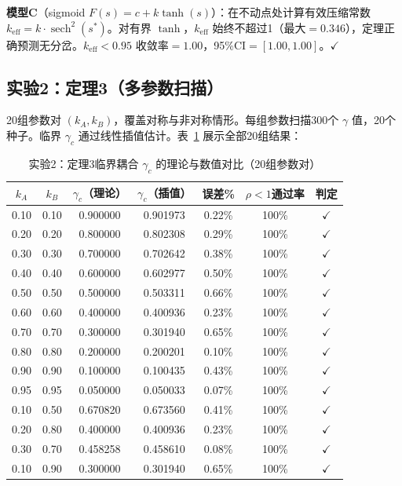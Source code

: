 \documentclass[12pt,a4paper]{article}
\theoremstyle{definition}
\newcommand{\gamc}{\gamma_c}
\begin{document}
\textbf{模型C}（sigmoid $F(s) = c + k\tanh(s)$）：在不动点处计算有效压缩常数 $k_{\mathrm{eff}} = k \cdot \operatorname{sech}^2(s^*)$。对有界 $\tanh$，$k_{\mathrm{eff}}$ 始终不超过1（最大$= 0.346$），定理正确预测无分岔。$k_{\mathrm{eff}} < 0.95$ 收敛率$= 1.00$，95\%CI$=[1.00, 1.00]$。$\checkmark$

\subsection{实验2：定理3（多参数扫描）}

20组参数对 $(k_A, k_B)$，覆盖对称与非对称情形。每组参数扫描300个 $\gamma$ 值，20个种子。临界 $\gamc$ 通过线性插值估计。表~\ref{tab:exp2-full} 展示全部20组结果：

\begin{table}[htbp]
\centering
\caption{实验2：定理3临界耦合 $\gamc$ 的理论与数值对比（20组参数对）}
\label{tab:exp2-full}
\small
\begin{tabular}{ccccccc}
\toprule
$k_A$ & $k_B$ & $\gamc$（理论） & $\gamc$（插值） & 误差\% & $\rho<1$通过率 & 判定 \\
\midrule
0.10 & 0.10 & 0.900000 & 0.901973 & 0.22\% & 100\% & $\checkmark$ \\
0.20 & 0.20 & 0.800000 & 0.802308 & 0.29\% & 100\% & $\checkmark$ \\
0.30 & 0.30 & 0.700000 & 0.702642 & 0.38\% & 100\% & $\checkmark$ \\
0.40 & 0.40 & 0.600000 & 0.602977 & 0.50\% & 100\% & $\checkmark$ \\
0.50 & 0.50 & 0.500000 & 0.503311 & 0.66\% & 100\% & $\checkmark$ \\
0.60 & 0.60 & 0.400000 & 0.400936 & 0.23\% & 100\% & $\checkmark$ \\
0.70 & 0.70 & 0.300000 & 0.301940 & 0.65\% & 100\% & $\checkmark$ \\
0.80 & 0.80 & 0.200000 & 0.200201 & 0.10\% & 100\% & $\checkmark$ \\
0.90 & 0.90 & 0.100000 & 0.100435 & 0.43\% & 100\% & $\checkmark$ \\
0.95 & 0.95 & 0.050000 & 0.050033 & 0.07\% & 100\% & $\checkmark$ \\
0.10 & 0.50 & 0.670820 & 0.673560 & 0.41\% & 100\% & $\checkmark$ \\
0.20 & 0.80 & 0.400000 & 0.400936 & 0.23\% & 100\% & $\checkmark$ \\
0.30 & 0.70 & 0.458258 & 0.458610 & 0.08\% & 100\% & $\checkmark$ \\
0.10 & 0.90 & 0.300000 & 0.301940 & 0.65\% & 100\% & $\checkmark$ \\

\end{tabular}
\end{table}
\end{document}

